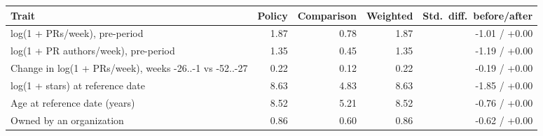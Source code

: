 \begin{tabular}{lrrrr}
\toprule
Trait & Policy & Comparison & Weighted & Std.\ diff.\ before/after \\
\midrule
log(1 + PRs/week), pre-period & 1.87 & 0.78 & 1.87 & -1.01 / +0.00 \\
log(1 + PR authors/week), pre-period & 1.35 & 0.45 & 1.35 & -1.19 / +0.00 \\
Change in log(1 + PRs/week), weeks -26..-1 vs -52..-27 & 0.22 & 0.12 & 0.22 & -0.19 / +0.00 \\
log(1 + stars) at reference date & 8.63 & 4.83 & 8.63 & -1.85 / +0.00 \\
Age at reference date (years) & 8.52 & 5.21 & 8.52 & -0.76 / +0.00 \\
Owned by an organization & 0.86 & 0.60 & 0.86 & -0.62 / +0.00 \\
\bottomrule
\end{tabular}
